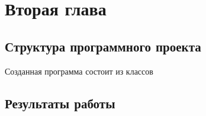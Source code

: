 ﻿\chapter{Вторая глава}

\section{Структура программного проекта}
Созданная программа состоит из классов
\section{Результаты работы}
